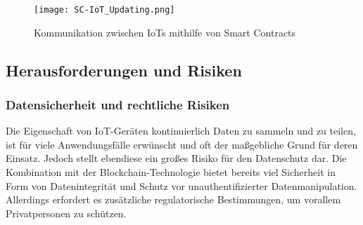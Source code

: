 \begin{figure}[!h]
    \begin{center}
        \texttt{[image: SC-IoT\_Updating.png]}
    \end{center}
    \caption{Kommunikation zwischen IoTs mithilfe von Smart Contracts}
    \label{fig:SC-IoT_Update}
\end{figure}









\subsection{Herausforderungen und Risiken}

\subsubsection{Datensicherheit und rechtliche Risiken}
Die Eigenschaft von IoT-Geräten kontinuierlich Daten zu sammeln und zu teilen, ist für viele 
Anwendungsfälle erwünscht und oft der ma\ss gebliche Grund für deren Einsatz. 
Jedoch stellt ebendiese ein gro\ss es Risiko für den Datenschutz dar. Die Kombination mit der 
Blockchain-Technologie bietet bereits viel Sicherheit in Form von Datenintegrität und Schutz vor 
unauthentifizierter Datenmanipulation. Allerdings erfordert es zusätzliche regulatorische Bestimmungen, 
um vorallem Privatpersonen zu schützen.

